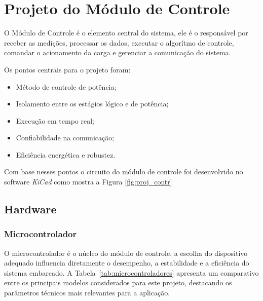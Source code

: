\section{Projeto do Módulo de Controle}

O Módulo de Controle é o elemento central do sistema, ele é o responsável por receber as medições, processar os dados, executar o algorítmo de controle, comandar o acionamento da carga e gerenciar a comunicação do sistema.

Os pontos centrais para o projeto foram:
\begin{itemize}
    \item Método de controle de potência;
    \item Isolamento entre os estágios lógico e de potência;
    \item Execução em tempo real;
    \item Confiabilidade na comunicação;
    \item Eficiência energética e robustez.
\end{itemize}

Com base nesses pontos o circuito do módulo de controle foi desenvolvido no software \textit{KiCad} como mostra a Figura \ref{fig:proj_contr}

\subsection{Hardware}

\subsubsection{Microcontrolador}

O microcontrolador é o núcleo do módulo de controle, a escolha do dispositivo adequado influencia diretamente o desempenho, a estabilidade e a eficiência do sistema embarcado. 
A Tabela~\ref{tab:microcontroladores} apresenta um comparativo entre os principais modelos considerados para este projeto, destacando os parâmetros técnicos mais relevantes para a aplicação.


